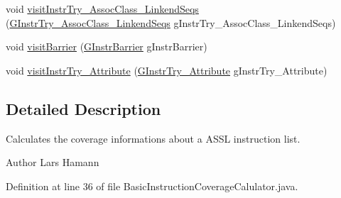 \begin{DoxyCompactItemize}
\item 
void \hyperlink{classorg_1_1tzi_1_1use_1_1gen_1_1assl_1_1statics_1_1_basic_instruction_coverage_calulator_a840f404f329720aa37443ebe09fd1a08}{visit\-Instr\-Try\-\_\-\-Assoc\-Class\-\_\-\-Linkend\-Seqs} (\hyperlink{classorg_1_1tzi_1_1use_1_1gen_1_1assl_1_1statics_1_1_g_instr_try___assoc_class___linkend_seqs}{G\-Instr\-Try\-\_\-\-Assoc\-Class\-\_\-\-Linkend\-Seqs} g\-Instr\-Try\-\_\-\-Assoc\-Class\-\_\-\-Linkend\-Seqs)
\item 
void \hyperlink{classorg_1_1tzi_1_1use_1_1gen_1_1assl_1_1statics_1_1_basic_instruction_coverage_calulator_abb1712bbb64200b1a839e2fc88a0ee63}{visit\-Barrier} (\hyperlink{classorg_1_1tzi_1_1use_1_1gen_1_1assl_1_1statics_1_1_g_instr_barrier}{G\-Instr\-Barrier} g\-Instr\-Barrier)
\item 
void \hyperlink{classorg_1_1tzi_1_1use_1_1gen_1_1assl_1_1statics_1_1_basic_instruction_coverage_calulator_a4c99ed7d32e7e7d79659a93768cdff2f}{visit\-Instr\-Try\-\_\-\-Attribute} (\hyperlink{classorg_1_1tzi_1_1use_1_1gen_1_1assl_1_1statics_1_1_g_instr_try___attribute}{G\-Instr\-Try\-\_\-\-Attribute} g\-Instr\-Try\-\_\-\-Attribute)
\end{DoxyCompactItemize}


\subsection{Detailed Description}
Calculates the coverage informations about a A\-S\-S\-L instruction list. \begin{DoxyAuthor}{Author}
Lars Hamann 
\end{DoxyAuthor}


Definition at line 36 of file Basic\-Instruction\-Coverage\-Calulator.\-java.



